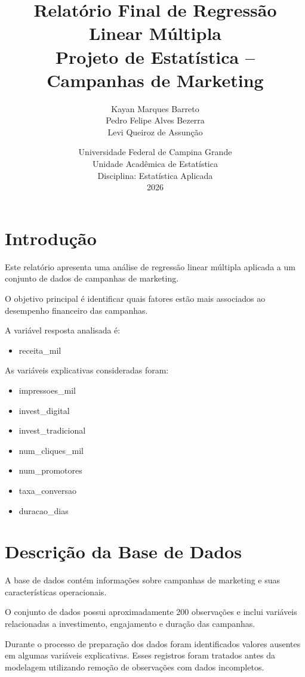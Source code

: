 \documentclass[12pt,a4paper]{article}
\title{
Relatório Final de Regressão Linear Múltipla \\
Projeto de Estatística – Campanhas de Marketing
}
\author{
Kayan Marques Barreto \\
Pedro Felipe Alves Bezerra \\
Levi Queiroz de Assunção
}
\date{
Universidade Federal de Campina Grande \\
Unidade Acadêmica de Estatística \\
Disciplina: Estatística Aplicada \\
2026
}
\begin{document}
\maketitle

\tableofcontents

\newpage

\section{Introdução}

Este relatório apresenta uma análise de regressão linear múltipla aplicada a um
conjunto de dados de campanhas de marketing.

O objetivo principal é identificar quais fatores estão mais associados ao
desempenho financeiro das campanhas.

A variável resposta analisada é:

\begin{itemize}
\item receita\_mil
\end{itemize}

As variáveis explicativas consideradas foram:

\begin{itemize}
\item impressoes\_mil
\item invest\_digital
\item invest\_tradicional
\item num\_cliques\_mil
\item num\_promotores
\item taxa\_conversao
\item duracao\_dias
\end{itemize}

\section{Descrição da Base de Dados}

A base de dados contém informações sobre campanhas de marketing
e suas características operacionais.

O conjunto de dados possui aproximadamente 200 observações
e inclui variáveis relacionadas a investimento, engajamento
e duração das campanhas.

Durante o processo de preparação dos dados foram identificados
valores ausentes em algumas variáveis explicativas.
Esses registros foram tratados antes da modelagem
utilizando remoção de observações com dados incompletos.
\end{document}
